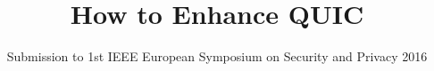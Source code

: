 \documentclass[conference]{IEEEtran}
\begin{document}
\title{How to Enhance QUIC}

\author{Submission to 1st IEEE European Symposium on Security and Privacy 2016}
\maketitle

 
 
 
 
 
 
 




\end{document}
